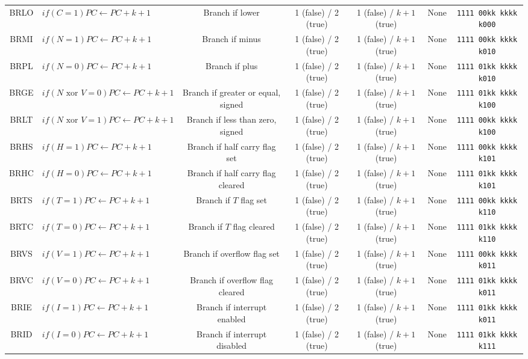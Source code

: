 \documentclass[11pt]{article}
\begin{document}
\begin{center}
\begin{longtable}{|c|m{12em}|c|c|c|c|c|}
BRLO & $if(C = 1) PC \leftarrow PC + k + 1$ & Branch if lower & 1 (false) / 2 (true) & 1 (false) / $k+1$ (true) & None & \texttt{1111 00kk kkkk k000}\\
BRMI & $if(N = 1) PC \leftarrow PC + k + 1$ & Branch if minus & 1 (false) / 2 (true) & 1 (false) / $k+1$ (true) & None & \texttt{1111 00kk kkkk k010}\\
BRPL & $if(N = 0) PC \leftarrow PC + k + 1$ & Branch if plus & 1 (false) / 2 (true) & 1 (false) / $k+1$ (true) & None & \texttt{1111 01kk kkkk k010}\\
BRGE & $if(N \text{ xor } V = 0) PC \leftarrow PC + k + 1$ & Branch if greater or equal, signed & 1 (false) / 2 (true) & 1 (false) / $k+1$ (true) & None & \texttt{1111 01kk kkkk k100}\\
BRLT & $if(N \text{ xor } V = 1) PC \leftarrow PC + k + 1$ & Branch if less than zero, signed & 1 (false) / 2 (true) & 1 (false) / $k+1$ (true) & None & \texttt{1111 00kk kkkk k100}\\
BRHS & $if(H = 1) PC \leftarrow PC + k + 1$ & Branch if half carry flag set & 1 (false) / 2 (true) & 1 (false) / $k+1$ (true) & None & \texttt{1111 00kk kkkk k101}\\
BRHC & $if(H = 0) PC \leftarrow PC + k + 1$ & Branch if half carry flag cleared & 1 (false) / 2 (true) & 1 (false) / $k+1$ (true) & None & \texttt{1111 01kk kkkk k101}\\
BRTS & $if(T = 1) PC \leftarrow PC + k + 1$ & Branch if $T$ flag set & 1 (false) / 2 (true) & 1 (false) / $k+1$ (true) & None & \texttt{1111 00kk kkkk k110}\\
BRTC & $if(T = 0) PC \leftarrow PC + k + 1$ & Branch if $T$ flag cleared & 1 (false) / 2 (true) & 1 (false) / $k+1$ (true) & None & \texttt{1111 01kk kkkk k110}\\
BRVS & $if(V = 1) PC \leftarrow PC + k + 1$ & Branch if overflow flag set & 1 (false) / 2 (true) & 1 (false) / $k+1$ (true) & None & \texttt{1111 00kk kkkk k011}\\
BRVC & $if(V = 0) PC \leftarrow PC + k + 1$ & Branch if overflow flag cleared & 1 (false) / 2 (true) & 1 (false) / $k+1$ (true) & None & \texttt{1111 01kk kkkk k011}\\
BRIE & $if(I = 1) PC \leftarrow PC + k + 1$ & Branch if interrupt enabled & 1 (false) / 2 (true) & 1 (false) / $k+1$ (true) & None & \texttt{1111 01kk kkkk k011}\\
BRID & $if(I = 0) PC \leftarrow PC + k + 1$ & Branch if interrupt disabled & 1 (false) / 2 (true) & 1 (false) / $k+1$ (true) & None & \texttt{1111 01kk kkkk k111}\\

\end{longtable}
\end{center}
\end{document}
